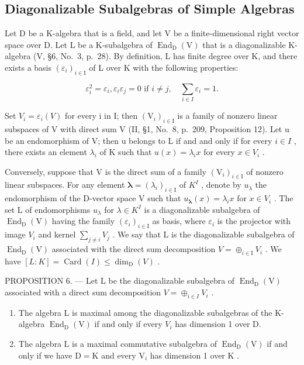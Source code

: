 \subsection{Diagonalizable Subalgebras of Simple Algebras}

Let D be a K-algebra that is a field, and let V be a finite-dimensional right vector space over D. Let L be a K-subalgebra of \(\operatorname{End}_{\mathrm{D}}(\mathrm{V})\) that is a diagonalizable K-algebra (V, §6, No.~3, p.~28). By definition, L has finite degree over K, and there exists a basis \((\varepsilon_{i})_{i\in\mathrm{I}}\) of L over K with the following properties:

\[
\varepsilon_ {i} ^ {2} = \varepsilon_ {i}, \varepsilon_ {i} \varepsilon_ {j} = 0 \text { if } i \neq j, \quad \sum_ {i \in I} \varepsilon_ {i} = 1.
\]

Set \(V_{i} = \varepsilon_{i}(V)\) for every i in I; then \((\mathrm{V}_{i})_{i \in \mathrm{I}}\) is a family of nonzero linear subspaces of V with direct sum V (II, §1, No.~8, p.~209, Proposition 12). Let u be an endomorphism of V; then u belongs to L if and and only if for every \(i \in I\) , there exists an element \(\lambda_{i}\) of K such that \(u(x) = \lambda_{i}x\) for every \(x \in V_{i}\) .

Conversely, suppose that V is the direct sum of a family \((\mathrm{V}_{i})_{i\in\mathrm{I}}\) of nonzero linear subspaces. For any element \(\boldsymbol{\lambda}=(\lambda_{i})_{i\in\mathrm{I}}\) of \(K^{I}\) , denote by \(u_{\lambda}\) the endomorphism of the D-vector space V such that \(u_{\boldsymbol{\lambda}}(x)=\lambda_{i}x\) for \(x\in V_{i}\) . The set L of endomorphisms \(u_{\lambda}\) for \(\lambda\in K^{I}\) is a diagonalizable subalgebra of \(\operatorname{End}_{\mathrm{D}}(\mathrm{V})\) having the family \((\varepsilon_{i})_{i\in\mathrm{I}}\) as basis, where \(\varepsilon_{i}\) is the projector with image \(V_{i}\) and kernel \(\sum_{j\neq i}V_{j}\) . We say that L is the diagonalizable subalgebra of \(\operatorname{End}_{\mathrm{D}}(\mathrm{V})\) associated with the direct sum decomposition \(V=\oplus_{i\in\mathrm{I}}V_{i}\) . We have \([L:K]=\operatorname{Card}(I)\leqslant\dim_{\mathrm{D}}(V)\) .

PROPOSITION 6. --- Let L be the diagonalizable subalgebra of \(\operatorname{End}_{\mathrm{D}}(\mathrm{V})\) associated with a direct sum decomposition \(V = \oplus_{i \in I} V_i\) .

\begin{enumerate}
\def\labelenumi{\alph{enumi})}
\item
  The algebra L is maximal among the diagonalizable subalgebras of the K-algebra \(\operatorname{End}_{\mathrm{D}}(\mathrm{V})\) if and only if every \(V_{i}\) has dimension 1 over D.
\item
  The algebra \(\mathrm{L}\) is a maximal commutative subalgebra of \(\operatorname{End}_{\mathrm{D}}(\mathrm{V})\) if and only if we have \(\mathrm{D} = \mathrm{K}\) and every \(\mathrm{V}_i\) has dimension 1 over \(\mathrm{K}\) .
\end{enumerate}

